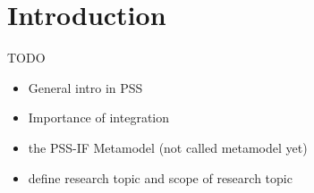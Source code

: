 \chapter{Introduction}
\label{chap:intro}

TODO

\begin{itemize}
\item General intro in PSS
\item Importance of integration
\item the PSS-IF Metamodel (not called metamodel yet)
\item define research topic and scope of research topic
\end{itemize}